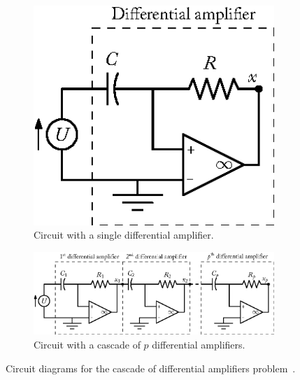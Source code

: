 \begin{figure}[htb]
  \centering
  \begin{subfigure}[t]{0.26\textwidth}
    \centering
    \includegraphics[width=1.0\textwidth]{figures/chapter_4/differential_amplifier_single.eps}
    \caption{Circuit with a single differential amplifier.}
    \label{chap:4:fig:diffamp_single}
  \end{subfigure}%
  \hfill%
  \begin{subfigure}[t]{0.72\textwidth}
    \centering
    \includegraphics[width=1.0\textwidth]{figures/chapter_4/differential_amplifier_cascade.eps}
    \caption{Circuit with a cascade of $p$ differential amplifiers.}
    \label{chap:4:fig:diffamp_cascade}
  \end{subfigure}
  \caption{Circuit diagrams for the cascade of differential amplifiers problem~\cite{brenan1995numerical}.}
  \label{chap:4:fig:diffamp_all}
\end{figure}

